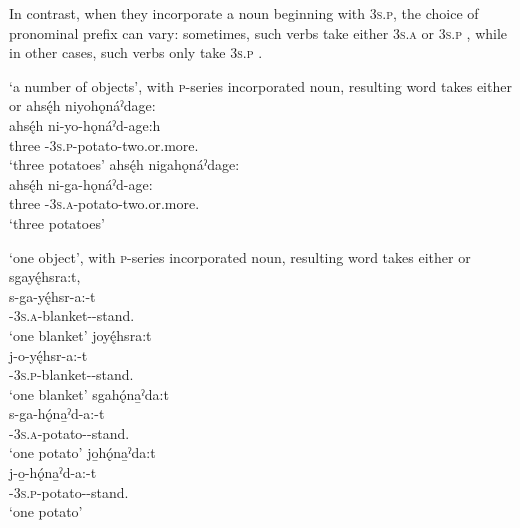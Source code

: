 In contrast, when they incorporate a noun beginning with  \textsc{3s.p}, the choice of pronominal prefix can vary: sometimes, such verbs take either  \textsc{3s.a} or  \textsc{3s.p} , while in other cases, such verbs only take  \textsc{3s.p} .

\ea\label{ex:countvarex}  ‘a number of objects’, with \textsc{p}-series incorporated noun, resulting word takes either  or 
\ea ahsę́h niyohǫnáˀdage:\\
\gll ahsę́h ni-yo-hǫnáˀd-age:h\\
 three {\partitive}-\textsc{3s.p}-potato-two.or.more.{\stative}\\
\glt `three potatoes'
\ex ahsę́h nigahǫnáˀdage:\\
\gll ahsę́h ni-ga-hǫnáˀd-age:\\
 three  {\partitive}-\textsc{3s.a}-potato-two.or.more.{\stative}\\
\glt `three potatoes'
\z
\z

\ea\label{ex:countvarex2}  ‘one object’, with \textsc{p}-series incorporated noun, resulting word takes either  or 
\ea sgayę́hsra:t, \\
\gll s-ga-yę́hsr-a:-t\\
 {\repetitive}-\textsc{3s.a}-blanket-{\joinerA}-stand.{\stative}\\
\glt `one blanket'
\ex joyę́hsra:t\\
\gll j-o-yę́hsr-a:-t\\
 {\repetitive}-\textsc{3s.p}-blanket-{\joinerA}-stand.{\stative}\\
\glt `one blanket'
\newpage
\ex sgahǫ́na̱ˀda:t\\
\gll s-ga-hǫ́na̱ˀd-a:-t\\
 {\repetitive}-\textsc{3s.a}-potato-{\joinerA}-stand.{\stative}\\
\glt `one potato'
\ex jo̱hǫ́na̱ˀda:t\\
\gll j-o̱-hǫ́na̱ˀd-a:-t \\
 {\repetitive}-\textsc{3s.p}-potato-{\joinerA}-stand.{\stative}\\
\glt `one potato'
\z
\z

